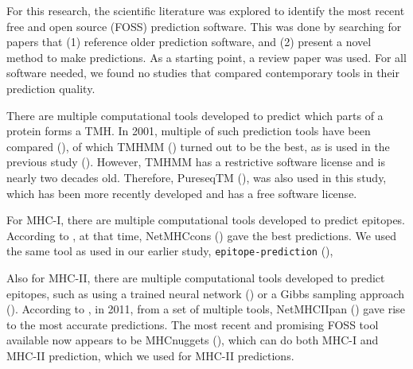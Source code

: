 For this research, the scientific literature was explored 
to identify the most recent free and open source (FOSS) prediction software.
This was done by searching for papers that (1) reference older
prediction software, and (2) present a novel method to make predictions.
As a starting point, a review paper was used.
For all software needed, we found no studies that compared contemporary tools 
in their prediction quality.


There are multiple computational tools developed to predict which
parts of a protein forms a TMH.
In 2001, multiple of such prediction tools have been compared (\cite{moller2001evaluation}),
of which TMHMM (\cite{krogh2001predicting}) turned out to be the best, 
as is used in the previous study (\cite{bianchi2017}).
However, TMHMM has a restrictive software license and is nearly two
decades old.
Therefore, PureseqTM (\cite{wang2019efficient}),
was also used in this study, which has been more recently developed
and has a free software license.


For MHC-I, there are multiple computational tools developed 
to predict epitopes. 
According to \cite{lundegaard2011prediction}, at that time,
NetMHCcons (\cite{karosiene2012netmhccons}) gave the best predictions.
We used the same tool as used in our earlier study, \verb;epitope-prediction; (\cite{bianchi2017}),


Also for MHC-II, there are multiple computational tools developed 
to predict epitopes,
such as using a trained neural network (\cite{nielsen2003reliable})
or a Gibbs sampling approach (\cite{nielsen2004improved}).
According to \cite{lundegaard2011prediction}, in 2011,
from a set of multiple tools, 
NetMHCIIpan (\cite{nielsen2008quantitative,karosiene2013netmhciipan})
gave rise to the most accurate predictions.
The most recent and promising FOSS tool available now appears
to be MHCnuggets (\cite{shao2020high}), which can do both MHC-I 
and MHC-II prediction, which we used for MHC-II predictions.

